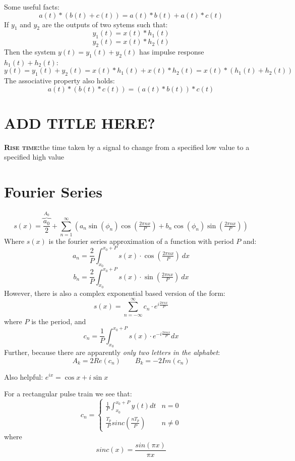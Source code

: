 \documentclass[a4paper,12pt]{article}
\newcommand{\define}[2]{\label{#1}\textbf{\textsc{#1:}}\quad#2\\}
\begin{document}
Some useful facts:
$$a(t)*(b(t)+c(t)) = a(t)*b(t)+a(t)*c(t)$$
If $y_1$ and $y_2$ are the outputs of two sytems such that:
$$y_1(t)=x(t)*h_1(t)$$
$$y_2(t)=x(t)*h_2(t)$$
Then the system $y(t)=y_1(t)+y_2(t)$ has impulse response $h_1(t)+h_2(t)$:
$$y(t)=y_1(t)+y_2(t) = x(t)*h_1(t)+x(t)*h_2(t)= x(t)*(h_1(t)+h_2(t))$$
The associative property also holds:
$$a(t)*(b(t)*c(t))=(a(t)*b(t))*c(t)$$
\section{ADD TITLE HERE?}
\define{Rise time}{the time taken by a signal to change from a specified low value to a specified high value}
\section{Fourier Series}
$$s(x)=\overbrace {\frac{a_{0}}{2}} ^{A_{0}}+\sum_{n=1}^{\infty}\left(a_{n}\sin(\phi _{n})\cos \left({\tfrac {2\pi nx}{P}}\right)+b_{n}\cos(\phi _{n})\sin \left({\tfrac {2\pi nx}{P}}\right)\right)$$
Where $s(x)$ is the fourier series approximation of a function with period $P$ and:
$$a_{n}={\frac {2}{P}}\int _{x_{0}}^{x_{0}+P}s(x)\cdot \cos \left({\tfrac {2\pi nx}{P}}\right)\ dx$$
$$b_{n}={\frac {2}{P}}\int _{x_{0}}^{x_{0}+P}s(x)\cdot \sin \left({\tfrac {2\pi nx}{P}}\right)\ dx$$
However, there is also a complex exponential based version of the form:
$$s(x)=\sum_{n=-\infty}^\infty c_n\cdot e^{i\frac{2\pi nx}{P}}$$
where $P$ is the period, and
$$c_n=\frac{1}{P}\int_{x_0}^{x_0+P}s(x)\cdot e^{-i\frac{2\pi nx}{P}} dx$$
Further, because there are apparently \textit{only two letters in the alphabet}:
$$A_k = 2Re(c_n)\qquad B_k = -2Im(c_n)$$%


Also helpful: $e^{ix}=\cos x+i\sin x$

For a rectangular pulse train we see that:
\[c_n=\begin{cases}
	\frac{1}{P}\int_{x_0}^{x_0+P}y(t) dt & n=0 \\
	\frac{T_p}{P}sinc \left(\frac{nT_p}{P}\right) & n\neq0
\end{cases}
\]
where
$$sinc(x)=\frac{sin(\pi x)}{\pi x}$$
\end{document}
